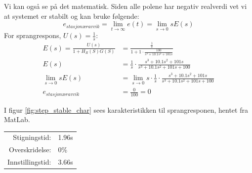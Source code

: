 Vi kan også se på det matematisk. Siden alle polene har negativ realverdi vet vi at systemet er stabilt og kan bruke følgende:
$$e_{stasjonæravvik} = \lim_{t \to \infty} e(t) = \lim_{s \to 0} sE(s) $$
For sprangrespons, $U(s) = \frac{1}{s}$:
\begin{align*}
	E(s) = \frac{U(s)}{1+H_R(S)G(S)} & = \frac{\frac{1}{s}}{1 + 1\cdot\frac{100}{s^3 + 10.1s^2 + 101s}}                                 \\
	E(s)                             & = \frac{1}{s} \cdot \frac{s^3 + 10.1s^2 + 101s}{s^3 + 10.1s^2 + 101s + 100}                      \\
	\lim_{s \to 0} sE(s)             & = \lim_{s \to 0} s\cdot\frac{1}{s} \cdot \frac{s^3 + 10.1s^2 + 101s}{s^3 + 10.1s^2 + 101s + 100} \\
	e_{stasjonæravvik}              & = \frac{0}{100} = 0                                                                              
\end{align*}
    
I figur \ref{fig:step_stable_char} sees karakteristikken til sprangresponen, hentet fra MatLab. \\
\begin{tabular}{r l}
	Stigningstid:  & 1.96s \\
	Overskridelse: & 0\%   \\
	Innstillingstid:  & 3.66s 
\end{tabular}
\label{itm:steady-state}


